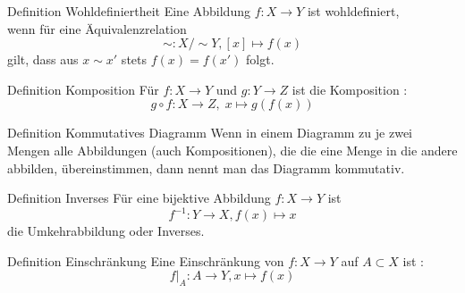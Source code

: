 \documentclass[a6paper,11pt,print,grid=front]{kartei}
\begin{document}
\begin{karte}{Definition Wohldefiniertheit}
    Eine Abbildung \(f: X \rightarrow Y\) ist wohldefiniert, \\
    wenn für eine Äquivalenzrelation 
    \[\sim : X / \sim Y, [x] \mapsto f(x)\] 
    gilt, dass aus \(x \sim x\prime \) stets \(f(x) = f(x \prime)\) folgt. 
\end{karte}
\begin{karte}{Definition Komposition}
    Für \(f: X \rightarrow Y\) und \(g: Y \rightarrow Z\) ist 
    die Komposition :
    \[g \circ f : X \rightarrow Z,\; x \mapsto g(f(x))\]
\end{karte}
\begin{karte}{Definition Kommutatives Diagramm}
    Wenn in einem Diagramm zu je zwei Mengen alle Abbildungen 
    (auch Kompositionen), die die eine Menge in die andere abbilden,
    übereinstimmen, dann nennt man das Diagramm kommutativ. 
\end{karte}
\begin{karte}{Definition Inverses}
    Für eine bijektive Abbildung \(f: X \rightarrow Y\) ist
    \[f^{-1}: Y \rightarrow X, f(x) \mapsto x\] 
    die Umkehrabbildung oder Inverses.
\end{karte}
\begin{karte}{Definition Einschränkung}
    Eine Einschränkung von \(f: X \rightarrow Y\) 
    auf \(A \subset X\) ist : \\
    \[f \vert_A : A \rightarrow Y, x \mapsto f(x)\]
\end{karte}
\end{document}
